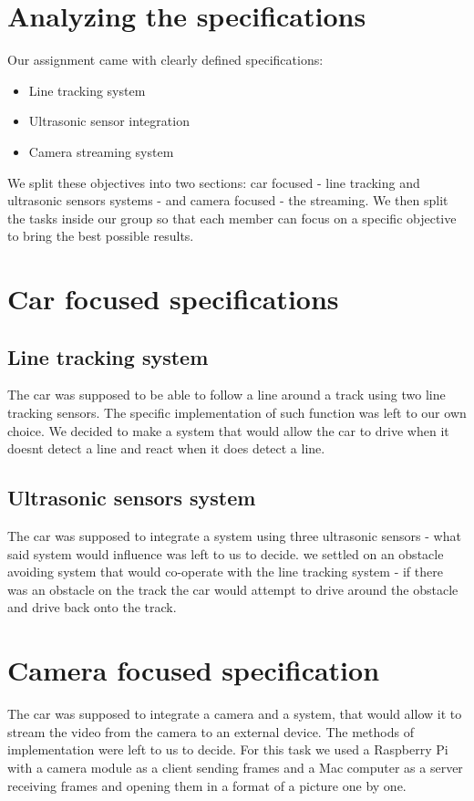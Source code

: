 \documentclass[conference]{IEEEtran}
\begin{document}
\section{Analyzing the specifications}

Our assignment came with clearly defined specifications:
\begin{itemize}
\item Line tracking system
\item Ultrasonic sensor integration
\item Camera streaming system
\end{itemize}
We split these objectives into two sections: car focused - line tracking and ultrasonic sensors systems - and camera focused - the streaming.
We then split the tasks inside our group so that each member can focus on a specific objective to bring the best possible results.


\section{Car focused specifications}
\subsection{Line tracking system}
The car was supposed to be able to follow a line around a track using two line tracking sensors. The specific implementation of such function was left to our own choice.
We decided to make a system that would allow the car to drive when it doesnt detect a line and react when it does detect a line.

\subsection{Ultrasonic sensors system}
The car was supposed to integrate a system using three ultrasonic sensors - what said system would influence was left to us to decide.
we settled on an obstacle avoiding system that would co-operate with the line tracking system - if there was an obstacle on the track the car
would attempt to drive around the obstacle and drive back onto the track.

\section{Camera focused specification}
The car was supposed to integrate a camera and a system, that would allow it to stream the video from the camera to an external device. The methods of implementation were left to us to decide.
For this task we used a Raspberry Pi with a camera module as a client sending frames and a Mac computer as a server receiving frames and opening them in a format of a picture one by one.
\end{document}
